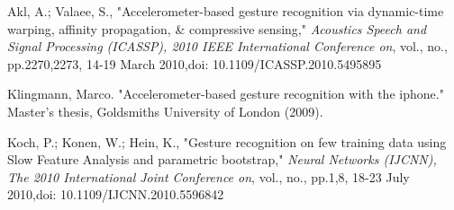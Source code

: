 \documentclass[conference]{IEEEtran}
\begin{document}

%
%
%
\begin{thebibliography}{7}

Akl, A.; Valaee, S., "Accelerometer-based gesture recognition via dynamic-time warping, affinity propagation, \& compressive sensing," \emph{Acoustics Speech and Signal Processing (ICASSP), 2010 IEEE International Conference on}, vol., no., pp.2270,2273, 14-19 March 2010,doi: 10.1109/ICASSP.2010.5495895

Klingmann, Marco. "Accelerometer-based gesture recognition with the iphone." Master's thesis, Goldsmiths University of London (2009).


Koch, P.; Konen, W.; Hein, K., "Gesture recognition on few training data using Slow Feature Analysis and parametric bootstrap," \emph{Neural Networks (IJCNN), The 2010 International Joint Conference on}, vol., no., pp.1,8, 18-23 July 2010,doi: 10.1109/IJCNN.2010.5596842




\end{thebibliography}
\end{document}
